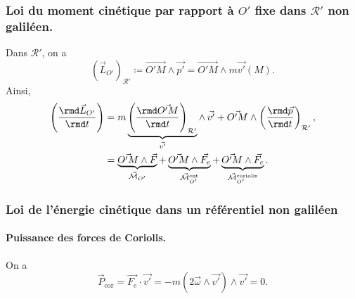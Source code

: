        \subsubsection{Loi du moment cinétique par rapport à $O'$ fixe dans $\mathcal{R}'$ non galiléen.}

            Dans $\mathcal{R}'$, on a
            \begin{equation*}
                \left(\vec{L}_{O'}\right)_{\mathcal{R}'}\coloneqq\vec{O'M}\wedge\vec{p'}=\vec{O'M}\wedge m\vec{v'}(M).
            \end{equation*}
            Ainsi,
            \begin{align*}
                \left(\frac{\rmd \vec{L}_{O'}}{\rmd t}\right)
                &=
                m\underbrace{\left(\frac{\rmd \vec{O'M}}{\rmd t}\right)_{\mathcal{R}'}}_{\vec{v'}}\wedge\,\vec{v'}+\vec{O'M}\wedge\left(\frac{\rmd\vec{p}}{\rmd t}\right)_{\mathcal{R}'},\\
                &=\underbrace{\vec{O'M}\wedge \vec{F}}_{\vec{\mathcal{M}}_{O'}}+\underbrace{\vec{O'M}\wedge\vec{F_e}}_{\vec{\mathcal{M}}^{\text{ent}}_{O'}}+\underbrace{\vec{O'M}\wedge\vec{F_c}}_{\vec{\mathcal{M}}^{\text{coriolis}}_{O'}}.
            \end{align*}

        \subsubsection{Loi de l'énergie cinétique dans un référentiel non galiléen}
            
            \paragraph{Puissance des forces de Coriolis.}
                On a 
                \begin{equation*}
                    \vec{P}_{\text{cor}}=\vec{F_e}\cdot\vec{v'}=-m\left(2\vec{\omega}\wedge\vec{v'}\right)\wedge\vec{v'}=0.
                \end{equation*}
            
